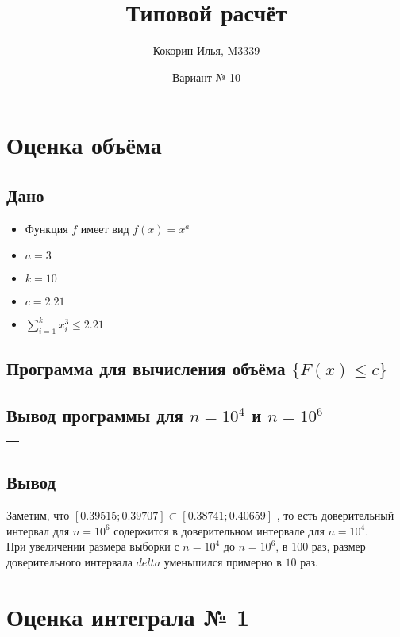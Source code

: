 \documentclass{article}
\title{Типовой расчёт}
\author{Кокорин Илья, M3339}
\date{Вариант № 10}
\begin{document}
	\maketitle
	\section{Оценка объёма}
	\subsection{Дано}
	\begin{itemize}
		\item Функция $f$ имеет вид $f(x) = x^a$
		\item $a = 3$
		\item $k = 10$
		\item $c = 2.21$ 
		\item $\sum\limits_{i = 1}^{k} x_i^3 \leq 2.21$
	\end{itemize}
	\subsection{Программа для вычисления объёма $\{F(\overline{x}) \le c\}$}
	\begin{minipage}{\linewidth}
		
	\end{minipage}
	\subsection{Вывод программы для $n = 10 ^ 4$ и $n = 10 ^ 6$}
	\begin{center}
		\begin{tabular}{c}
			\begin{minipage}{\linewidth}
				
				
			\end{minipage}
		\end{tabular}
	\end{center}
	\subsection{Вывод}
	Заметим, что $[0.39515;  0.39707] \subset [0.38741; 0.40659]$ , то есть доверительный интервал для $n = 10^6$ содержится в доверительном интервале для $n = 10^4$.\\
	При увеличении размера выборки с $n = 10 ^ 4$ до $n = 10 ^ 6$, в $100$ раз, размер доверительного интервала $delta$ уменьшился примерно в $10$ раз.
	\section{Оценка интеграла № 1}
\end{document}
